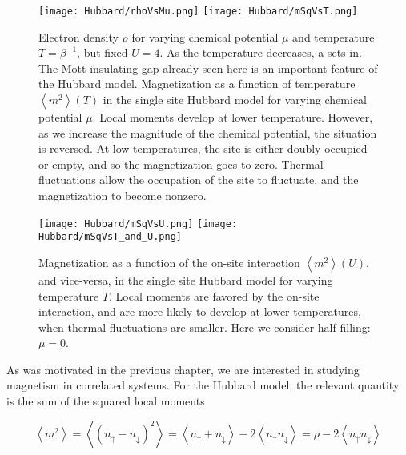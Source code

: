 \begin{figure}[H]
\hspace{5mm}\texttt{[image: Hubbard/rhoVsMu.png]}
\hspace{0.02cm}
\texttt{[image: Hubbard/mSqVsT.png]}
	\caption[Electron density in the purely atomic limit of the Hubbard model. Magnetization as a function of temperature $\left\langle m^2 \right\rangle (T)$ in the single site Hubbard model for varying chemical potential $\mu$.]{Electron density $\rho$ for varying chemical potential $\mu$ and temperature $T = \beta^{-1}$, but fixed $U = 4$. As the temperature decreases, a  sets in. The Mott insulating gap already seen here is an important feature of the Hubbard model.
	Magnetization as a function of temperature $\left\langle m^2 \right\rangle (T)$ in the single site Hubbard model for varying chemical potential $\mu$.
	Local moments develop at lower temperature.
	However, as we increase the magnitude of the chemical potential, the situation is reversed.
	At low temperatures, the site is either  doubly occupied or empty, and so the magnetization goes to zero.
	Thermal fluctuations allow the occupation of the site to fluctuate, and the magnetization to become nonzero.
	}
	\label{fig:rhoVsMu_mSqVsT}
\end{figure}


\begin{figure}[H]
\hspace{5mm}
\texttt{[image: Hubbard/mSqVsU.png]}
\hspace{0.02cm}
\texttt{[image: Hubbard/mSqVsT\_and\_U.png]}
	\caption[Magnetization as a function of the on-site interaction $\left\langle m^2 \right\rangle (U)$, and vice-versa, in the single site Hubbard model for varying temperature $T$.]{Magnetization as a function of the on-site interaction $\left\langle m^2 \right\rangle (U)$, and vice-versa, in the single site Hubbard model for varying temperature $T$.
	Local moments are favored by the on-site interaction, and are more likely to develop at lower temperatures, when thermal fluctuations are smaller. Here we consider half filling: $\mu = 0$.}
	\label{fig:mSqVsU}
\end{figure}

As was motivated in the previous chapter, we are interested in studying magnetism in correlated systems.
For the Hubbard model, the relevant quantity is the sum of the squared  local moments

\begin{equation}
\left\langle m^2 \right\rangle = \left\langle ( n_\uparrow - n_\downarrow )^2 \right\rangle = \left\langle n_\uparrow + n_\downarrow \right\rangle - 2  \left\langle n_\uparrow n_\downarrow \right\rangle = \rho - 2  \left\langle n_\uparrow n_\downarrow \right\rangle
\end{equation}


